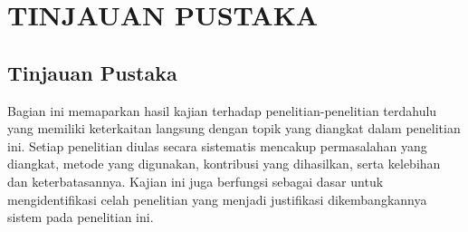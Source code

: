 \newpage
\chapter{TINJAUAN PUSTAKA} \label{Bab II}

\section{Tinjauan Pustaka} \label{II.Tinjauan}
Bagian ini memaparkan hasil kajian terhadap penelitian-penelitian terdahulu yang memiliki keterkaitan langsung dengan topik yang diangkat dalam penelitian ini. Setiap penelitian diulas secara sistematis mencakup permasalahan yang diangkat, metode yang digunakan, kontribusi yang dihasilkan, serta kelebihan dan keterbatasannya. Kajian ini juga berfungsi sebagai dasar untuk mengidentifikasi celah penelitian yang menjadi justifikasi dikembangkannya sistem pada penelitian ini.

